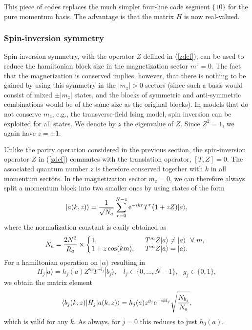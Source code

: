 \documentclass[draft,numberedheadings]{aipproc}
\begin{document}
\noindent
This piece of codes replaces the much simpler four-line code segment $\{10\}$ for the pure momentum basis. The advantage is that the matrix $H$
is now real-valued.

\subsubsection{Spin-inversion symmetry}
\label{spininversion}

Spin-inversion symmetry, with the operator $Z$ defined in (\ref{zdef}), can be used to reduce the hamiltonian block size in the magnetization sector $m^z=0$. 
The fact that the magnetization is conserved implies, however, that there is nothing to be gained by using this symmetry in the $|m_z|>0$ sectors (since such a 
basis would consist of mixed $\pm |m_z|$ states, and the blocks of symmetric and anti-symmetric combinations would be of the same size as the original blocks). 
In models that do not conserve $m_z$, e.g., the transverse-field Ising model, spin inversion can be exploited for all states. We denote by $z$ the eigenvalue 
of $Z$. Since $Z^2=1$, we again have $z=\pm 1$. 

Unlike the parity operation considered in the previous section, the spin-inversion operator $Z$ in (\ref{zdef}) commutes with the translation
operator, $[T,Z]=0$. The associated quantum number $z$ is therefore conserved together with $k$ in all momentum sectors. In the magnetization sector 
$m_z=0$, we can therefore always split a momentum block into two smaller ones by using states of the form
\begin{equation}
|a(k,z)\rangle = \frac{1}{\sqrt{N_a}} \sum_{r=0}^{N-1} {\rm e}^{-ikr} 
T^r \bigl (1+ zZ)|a\rangle,
\label{akzdef}
\end{equation}
where the normalization constant is easily obtained as
\begin{equation}
N_a= \frac{2N^2}{R_a} \times \left \lbrace \begin{array}{ll}
\hbox{\hskip-1.5mm} 1,~~            & T^mZ|a\rangle \not= |a\rangle ~~\forall~ m, \\
\hbox{\hskip-1.5mm} 1+z\cos(km),~~  & T^mZ|a\rangle = |a\rangle.
\end{array}\right.
\label{normkz}
\end{equation}
For a hamiltonian operation on $|\alpha\rangle$ resulting in
\begin{equation}
H_j|a\rangle = h_j(a) Z^{g_j}T^{-l_j}|b_j\rangle,~~~~ l_j \in \{0,\ldots,N-1\},~~~ g_j \in \{0,1\},
\end{equation}
we obtain the matrix element
\begin{equation}
\langle b_j(k,z)|H_j|a(k,z)\rangle = h_j(a)z^{g_j}{\rm e}^{-ik{l_j}} \sqrt{\frac{N_{b_j}}{N_a}},
\label{hamkz}
\end{equation}
which is valid for any $k$. As always, for $j=0$ this reduces to just $h_0(a)$.
\end{document}
